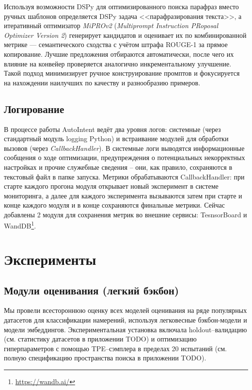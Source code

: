 \documentclass[14pt,a4paper,oneside,openany]{extbook}
\begin{document}
Используя возможности DSPy для оптимизированного поиска парафраз вместо ручных шаблонов определяется DSPy задача {}<<парафразирования текста>>{}, а итеративный оптимизатор \emph{MiPROv2}\autocite{opsahl-ong_optimizing_2024} (\emph{Multiprompt Instruction PRoposal Optimizer Version 2}) генерирует кандидатов и оценивает их по комбинированной метрике — семантического сходства с учётом штрафа ROUGE-1\autocite{lin_rouge_} за прямое копирование. Лучшие предложения отбираются автоматически, после чего их влияние на конвейер проверяется аналогично инкрементальному улучшение. Такой подход минимизирует ручное конструирование промптов и фокусируется на нахождении наилучших по качеству и разнообразию примеров.
\section{Логирование}
\label{sec:org4978030}
В процессе работы AutoIntent ведёт два уровня логов: системные (через стандартный модуль logging Python) и встраивание модулей для обработки вызовов (через \emph{CallbackHandler}). В системные логи выводятся информационные сообщения о ходе оптимизации, предупреждения о потенциальных некорректных настройках и прочие служебные сведения – они, как правило, сохраняются в текстовый файл в папке запуска. Метрики обрабатываются CallbackHandler: при старте каждого прогона модуля открывает новый эксперимент в системе мониторинга, а далее для каждого эксперимента вызываются затем при старте и конце каждого модуля и в конце сохраняются финальные метрики. Сейчас добавлены 2 модуля для сохранения метрик во внешние сервисы: TesnsorBoard и WandDB\footnote{\url{https://wandb.ai/}}.
\chapter{Эксперименты}
\label{sec:orgb915de1}
\section{Модули оценивания (легкий бэкбон)}
\label{sec:orga2ebfab}

Мы провели всестороннюю оценку всех моделей оценивания на ряде популярных датасетов для классификации намерений, используя легковесные бэкбон-модели и модели эмбеддингов. Экспериментальная установка включала holdout–валидацию (см. статистику датасетов в приложении TODO) и оптимизацию гиперпараметров с помощью TPE–сэмплера в пределах 20 испытаний (см. полную спецификацию пространства поиска в приложении TODO).
\end{document}
